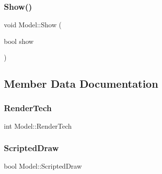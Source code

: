 \hypertarget{class_model_a80838459aa5009f9b4b98d29e635f763}{}\label{class_model_a80838459aa5009f9b4b98d29e635f763} 
\subsubsection{\texorpdfstring{Show()}{Show()}}
{\footnotesize\ttfamily void Model\+::\+Show (\begin{DoxyParamCaption}\item[{bool}]{show }\end{DoxyParamCaption})}



\subsection{Member Data Documentation}
\hypertarget{class_model_ae4c4fbc46184372c35031f6f5cc186db}{}\label{class_model_ae4c4fbc46184372c35031f6f5cc186db} 
\subsubsection{\texorpdfstring{Render\+Tech}{RenderTech}}
{\footnotesize\ttfamily int Model\+::\+Render\+Tech}

\hypertarget{class_model_ab32bab73b06f9b7b043b8df0377f1503}{}\label{class_model_ab32bab73b06f9b7b043b8df0377f1503} 
\subsubsection{\texorpdfstring{Scripted\+Draw}{ScriptedDraw}}
{\footnotesize\ttfamily bool Model\+::\+Scripted\+Draw}

